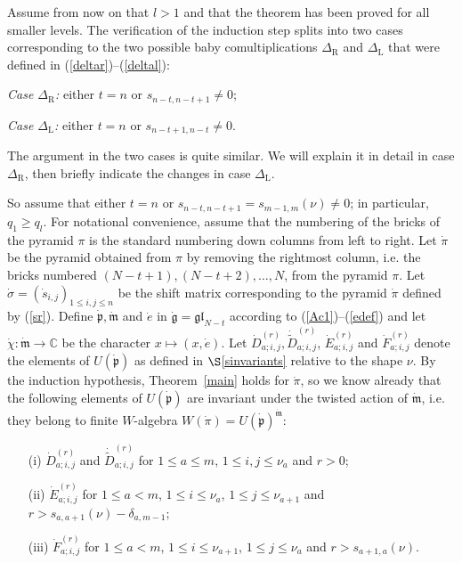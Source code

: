 \documentclass[twoside,12pt,reqno]{amsart}
\def\rt{{\operatorname{\scriptscriptstyle R}}}
\def\lt{{\operatorname{\scriptscriptstyle L}}}
\def\C{{\mathbb C}}
\begin{document}
Assume from now on that $l > 1$ 
and that the theorem has been proved for all
smaller levels. 
The verification of the induction step
splits into two cases corresponding to the two possible 
baby comultiplications $\Delta_{\rt}$ and $\Delta_{\lt}$ that were defined
in (\ref{deltar})--(\ref{deltal}):

\noindent
{\em Case $\Delta_{\rt}$:} 
either $t=n$ or $s_{n-t,n-t+1} \neq 0$;

\noindent
{\em Case $\Delta_{\lt}$:} either $t=n$ or $s_{n-t+1,n-t} \neq 0$.

\noindent
The argument in the two cases is quite similar.  We will  explain it in 
detail in
case $\Delta_{\rt}$, then briefly indicate the changes in case $\Delta_{\lt}$.

So assume that 
either $t = n$ or
$s_{n-t,n-t+1} = s_{m-1,m}(\nu) \neq 0$; in particular, $q_1 \geq q_l$.
For notational convenience, assume that the numbering of the
bricks of the pyramid $\pi$ is the standard numbering
down columns from left to right.
Let $\dot\pi$ be the pyramid
obtained from $\pi$ by removing the rightmost column,
i.e. the bricks numbered $(N-t+1),(N-t+2),\dots,N$, from the pyramid $\pi$.
Let $\dot\sigma = 
(\dot s_{i,j})_{1 \leq i,j \leq n}$ be 
the shift matrix corresponding to the pyramid $\dot\pi$ defined by (\ref{sr}).
Define $\dot{\mathfrak{p}}, \dot{\mathfrak{m}}$ and $\dot e$
in $\dot{\mathfrak{g}} = \mathfrak{gl}_{N-t}$
according to (\ref{Ac1})--(\ref{edef})
and let $\dot\chi:\dot{\mathfrak{m}}\rightarrow \C$
be the character $x \mapsto (x,\dot e)$.
Let $\dot D_{a;i,j}^{(r)}, \dot{{\widetilde D}}_{a;i,j}^{(r)}$,
$\dot E_{a;i,j}^{(r)}$ and $\dot F_{a;i,j}^{(r)}$ denote the
elements of $U(\dot{\mathfrak{p}})$ as defined in $\S$\ref{sinvariants}
relative to the shape $\nu$. 
By the induction hypothesis, Theorem~\ref{main} holds for $\dot\pi$,
so we know already that the following elements of
$U(\dot{\mathfrak{p}})$ are
invariant under the twisted action of $\dot{\mathfrak{m}}$, 
i.e. they belong to
finite $W$-algebra
$W(\dot\pi) = U(\dot{\mathfrak{p}})^{\dot{\mathfrak{m}}}$:
\begin{itemize}
\item[(i)] $\dot D_{a;i,j}^{(r)}$ and $\dot{{\widetilde D}}_{a;i,j}^{(r)}$
for  $1 \leq a \leq m$, $1 \leq i,j \leq \nu_a$ and $r > 0$;
\item[(ii)] $\dot E_{a;i,j}^{(r)}$ for 
$1 \leq a < m$, $1 \leq i \leq \nu_a$, $1 \leq j \leq \nu_{a+1}$
and $r > s_{a,a+1}(\nu) - \delta_{a,m-1}$;
\item[(iii)] $\dot F_{a;i,j}^{(r)}$ 
 for 
$1 \leq a< m$, $1 \leq i \leq \nu_{a+1}$, $1 \leq j \leq \nu_{a}$
and $r > s_{a+1,a}(\nu)$.
\end{itemize}
\end{document}
